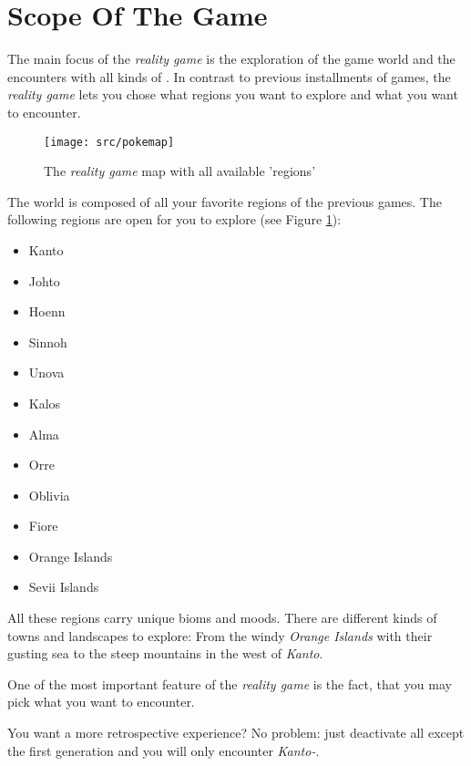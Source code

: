\section{Scope Of The Game}

The main focus of the \emph{\poke{} reality game} is the exploration of the game world and the encounters with all kinds of \poke{}. In contrast to previous installments of \poke{} games, the \emph{\poke{} reality game} lets you chose what regions you want to explore and what \poke{} you want to encounter.

\begin{figure}[!ht]
\begin{center}
\texttt{[image: src/pokemap]}
\end{center}
\caption[The \emph{\pokeT{} reality game} map with all available 'regions']{The \emph{\poke{} reality game} map with all available 'regions'}
\label{pokemap}
\end{figure}

The \poke{} world is composed of all your favorite regions of the previous games. The following regions are open for you to explore (see Figure \ref{pokemap}):
\begin{multicols}{2}
\begin{itemize}
\item Kanto
\item Johto
\item Hoenn
\item Sinnoh
\item Unova
\item Kalos
\item Alma
\item Orre
\item Oblivia
\item Fiore
\item Orange Islands
\item Sevii Islands
\end{itemize} 
\end{multicols}

All these regions carry unique bioms and moods. There are different kinds of towns and landscapes to explore: From the windy \emph{Orange Islands} with their gusting sea to the steep mountains in the west of \emph{Kanto}.

One of the most important feature of the \emph{\poke{} reality game} is the fact, that you may pick what \poke{} you want to encounter. 

You want a more retrospective experience? No problem: just deactivate all \poke{} except the first generation and you will only encounter \emph{Kanto-\poke{}}.


